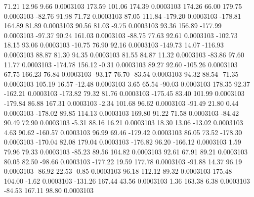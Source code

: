        71.21       12.96        9.66     0.0003103
      173.59      101.06      174.39     0.0003103
      174.26       66.00      179.75     0.0003103
      -82.76       91.98       71.72     0.0003103
       87.05      111.84     -179.20     0.0003103
     -178.81      164.89       81.89     0.0003103
       90.56       81.03       -9.75     0.0003103
       93.36      156.89     -177.99     0.0003103
      -97.37       90.24      161.03     0.0003103
      -88.75       77.63       92.61     0.0003103
     -102.73       18.15       93.06     0.0003103
      -10.75       76.90       92.16     0.0003103
     -149.73       14.07     -116.93     0.0003103
       88.87       81.30       94.35     0.0003103
       81.55       84.87       11.32     0.0003103
      -83.86       97.60       11.77     0.0003103
     -174.78      156.12       -0.31     0.0003103
       89.27       92.60     -105.26     0.0003103
       67.75      166.23       76.84     0.0003103
      -93.17       76.70      -83.54     0.0003103
       94.32       88.54      -71.35     0.0003103
      105.19       16.57      -12.48     0.0003103
        3.65       65.54      -90.03     0.0003103
      178.35       92.37     -162.21     0.0003103
     -173.82       79.32       81.76     0.0003103
     -175.45       83.40      101.99     0.0003103
     -179.84       86.88      167.31     0.0003103
       -2.34      101.68       96.62     0.0003103
      -91.49       21.80        0.44     0.0003103
     -178.02       89.85      114.13     0.0003103
      169.80       91.22       71.58     0.0003103
      -84.42       90.49       72.90     0.0003103
       -5.31       88.16       16.21     0.0003103
       18.30       13.06      -13.02     0.0003103
        4.63       90.62     -160.57     0.0003103
       96.99       69.46     -179.42     0.0003103
       86.05       73.52     -178.30     0.0003103
     -170.04       82.08      179.04     0.0003103
     -176.82       96.20     -166.12     0.0003103
        1.59       79.96       79.33     0.0003103
      -85.23       89.56      104.82     0.0003103
       92.61       67.91       89.21     0.0003103
       80.05       82.50      -98.66     0.0003103
     -177.22       19.59      177.78     0.0003103
      -91.88       14.37       96.19     0.0003103
      -86.92       22.53       -0.85     0.0003103
       96.18      112.12       89.32     0.0003103
      175.48      104.00       -1.62     0.0003103
     -131.26      167.44       43.56     0.0003103
        1.36      163.38        6.38     0.0003103
      -84.53      167.11       98.80     0.0003103
